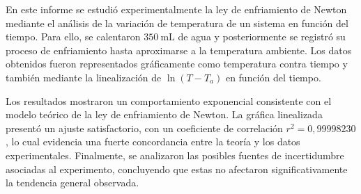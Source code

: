En este informe se estudió experimentalmente la ley de enfriamiento de Newton mediante el análisis de la variación de temperatura de un sistema en función del tiempo. Para ello, se calentaron \(350\ \mathrm{mL}\) de agua y posteriormente se registró su proceso de enfriamiento hasta aproximarse a la temperatura ambiente. Los datos obtenidos fueron representados gráficamente como temperatura contra tiempo y también mediante la linealización de \(\ln(T-T_a)\) en función del tiempo.

Los resultados mostraron un comportamiento exponencial consistente con el modelo teórico de la ley de enfriamiento de Newton. La gráfica linealizada presentó un ajuste satisfactorio, con un coeficiente de correlación \(r^2 = 0{,}99998230\), lo cual evidencia una fuerte concordancia entre la teoría y los datos experimentales. Finalmente, se analizaron las posibles fuentes de incertidumbre asociadas al experimento, concluyendo que estas no afectaron significativamente la tendencia general observada.
